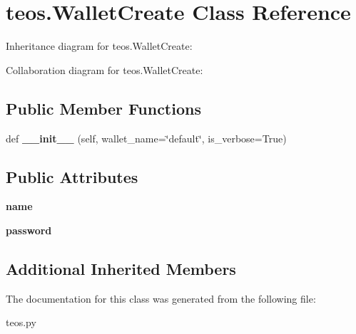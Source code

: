 \hypertarget{classteos_1_1WalletCreate}{}\section{teos.\+Wallet\+Create Class Reference}
\label{classteos_1_1WalletCreate}


Inheritance diagram for teos.\+Wallet\+Create\+:


Collaboration diagram for teos.\+Wallet\+Create\+:
\subsection*{Public Member Functions}
\begin{DoxyCompactItemize}
\item 
\mbox{\label{classteos_1_1WalletCreate_af54249d8f528c14fa65cc87f9a07f57c}} 
def {\bfseries \+\_\+\+\_\+init\+\_\+\+\_\+} (self, wallet\+\_\+name=\char`\"{}default\char`\"{}, is\+\_\+verbose=True)
\end{DoxyCompactItemize}
\subsection*{Public Attributes}
\begin{DoxyCompactItemize}
\item 
\mbox{\label{classteos_1_1WalletCreate_ae97e708d4596c71110836f5f8cb5feda}} 
{\bfseries name}
\item 
\mbox{\label{classteos_1_1WalletCreate_a9b38a46f9235e9e0c08881158ea2220c}} 
{\bfseries password}
\end{DoxyCompactItemize}
\subsection*{Additional Inherited Members}


The documentation for this class was generated from the following file\+:\begin{DoxyCompactItemize}
\item 
teos.\+py\end{DoxyCompactItemize}
